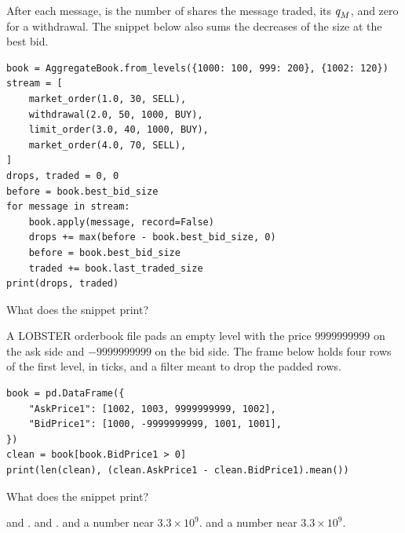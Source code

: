 \begin{question}
\label{question.sizeIsNotVolume}
After each message,
 is the number of shares the message traded,
its $q_{M}^{}$, and zero for a withdrawal.
The snippet below also sums the decreases of the size at the best bid.
\begin{lstlisting}[caption={Decreases of the best size against the traded size}, label=listing.sizeIsNotVolume]
book = AggregateBook.from_levels({1000: 100, 999: 200}, {1002: 120})
stream = [
    market_order(1.0, 30, SELL),
    withdrawal(2.0, 50, 1000, BUY),
    limit_order(3.0, 40, 1000, BUY),
    market_order(4.0, 70, SELL),
]
drops, traded = 0, 0
before = book.best_bid_size
for message in stream:
    book.apply(message, record=False)
    drops += max(before - book.best_bid_size, 0)
    before = book.best_bid_size
    traded += book.last_traded_size
print(drops, traded)
\end{lstlisting}
What does the snippet print?
\begin{choices}
 \choice {}
 \correctchoice {}
 \choice {}
 \choice {}
\end{choices}
\end{question}

\begin{question}
\label{question.paddingSentinelsInTheSpread}
A LOBSTER orderbook file pads an empty level with the price $9999999999$ on the ask side
and $-9999999999$ on the bid side.
The frame below holds four rows of the first level, in ticks,
and a filter meant to drop the padded rows.
\begin{lstlisting}[caption={A mean spread after a filter}, label=listing.paddingSentinels]
book = pd.DataFrame({
    "AskPrice1": [1002, 1003, 9999999999, 1002],
    "BidPrice1": [1000, -9999999999, 1001, 1001],
})
clean = book[book.BidPrice1 > 0]
print(len(clean), (clean.AskPrice1 - clean.BidPrice1).mean())
\end{lstlisting}
What does the snippet print?
\begin{choices}
 \choice {} and .
 \choice {} and .
 \choice {} and a number near $3.3 \times 10^{9}$.
 \correctchoice {} and a number near $3.3 \times 10^{9}$.
\end{choices}
\end{question}

